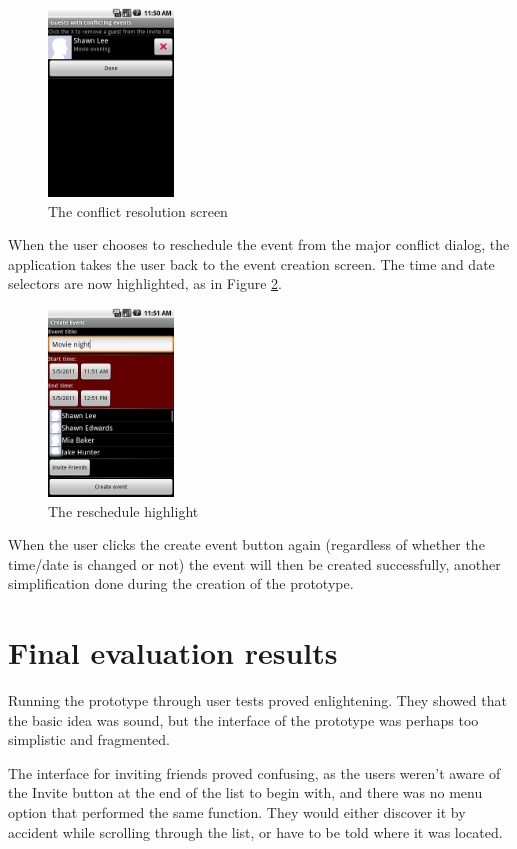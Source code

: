 \documentclass[a4paper,11pt]{report}
\begin{document}
\begin{figure}[htb]
  \centering
  \includegraphics[height=50mm]{resolution}
  \caption{The conflict resolution screen}
  \label{fig:resolve}
\end{figure}

When the user chooses to reschedule the event from the major conflict dialog,
the application takes the user back to the event creation screen. The time and
date selectors are now highlighted, as in Figure \ref{fig:reschedule}.

\begin{figure}[htb]
  \centering
  \includegraphics[height=50mm]{reschedule}
  \caption{The reschedule highlight}
  \label{fig:reschedule}
\end{figure}

When the user clicks the create event button again (regardless of whether the
time/date is changed or not) the event will then be created successfully,
another simplification done during the creation of the prototype.

\section{Final evaluation results}

Running the prototype through user tests proved enlightening. They showed that the
basic idea was sound, but the interface of the prototype was perhaps too
simplistic and fragmented.

The interface for inviting friends proved confusing, as the users weren't aware
of the Invite button at the end of the list to begin with, and there was no menu
option that performed the same function. They would either discover it by
accident while scrolling through the list, or have to be told where it was
located.
\end{document}
